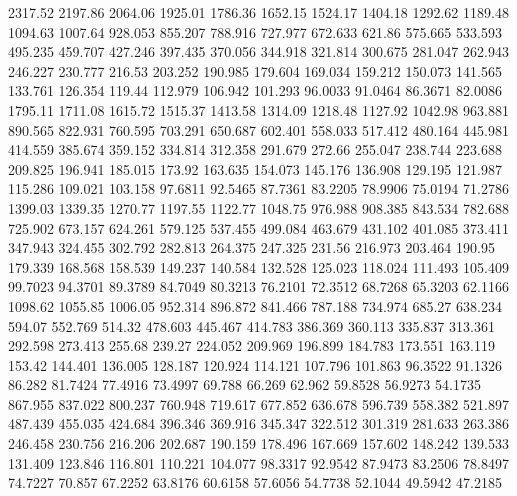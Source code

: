 2317.52      2197.86      2064.06      1925.01      1786.36      1652.15      1524.17      1404.18      1292.62      1189.48      1094.63      1007.64      928.053      855.207      788.916      727.977      672.633      621.86      575.665      533.593      495.235      459.707      427.246      397.435      370.056      344.918      321.814      300.675      281.047      262.943      246.227      230.777      216.53      203.252      190.985      179.604      169.034      159.212      150.073      141.565      133.761      126.354      119.44      112.979      106.942      101.293      96.0033      91.0464      86.3671      82.0086      
1795.11      1711.08      1615.72      1515.37      1413.58      1314.09      1218.48      1127.92      1042.98      963.881      890.565      822.931      760.595      703.291      650.687      602.401      558.033      517.412      480.164      445.981      414.559      385.674      359.152      334.814      312.358      291.679      272.66      255.047      238.744      223.688      209.825      196.941      185.015      173.92      163.635      154.073      145.176      136.908      129.195      121.987      115.286      109.021      103.158      97.6811      92.5465      87.7361      83.2205      78.9906      75.0194      71.2786      
1399.03      1339.35      1270.77      1197.55      1122.77      1048.75      976.988      908.385      843.534      782.688      725.902      673.157      624.261      579.125      537.455      499.084      463.679      431.102      401.085      373.411      347.943      324.455      302.792      282.813      264.375      247.325      231.56      216.973      203.464      190.95      179.339      168.568      158.539      149.237      140.584      132.528      125.023      118.024      111.493      105.409      99.7023      94.3701      89.3789      84.7049      80.3213      76.2101      72.3512      68.7268      65.3203      62.1166      
1098.62      1055.85      1006.05      952.314      896.872      841.466      787.188      734.974      685.27      638.234      594.07      552.769      514.32      478.603      445.467      414.783      386.369      360.113      335.837      313.361      292.598      273.413      255.68      239.27      224.052      209.969      196.899      184.783      173.551      163.119      153.42      144.401      136.005      128.187      120.924      114.121      107.796      101.863      96.3522      91.1326      86.282      81.7424      77.4916      73.4997      69.788      66.269      62.962      59.8528      56.9273      54.1735      
867.955      837.022      800.237      760.948      719.617      677.852      636.678      596.739      558.382      521.897      487.439      455.035      424.684      396.346      369.916      345.347      322.512      301.319      281.633      263.386      246.458      230.756      216.206      202.687      190.159      178.496      167.669      157.602      148.242      139.533      131.409      123.846      116.801      110.221      104.077      98.3317      92.9542      87.9473      83.2506      78.8497      74.7227      70.857      67.2252      63.8176      60.6158      57.6056      54.7738      52.1044      49.5942      47.2185      
